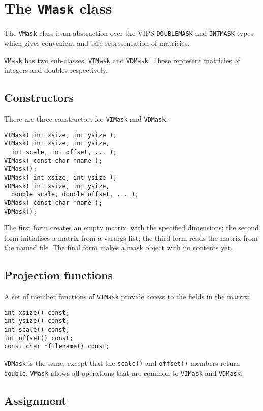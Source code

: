 \section{The \texttt{VMask} class}

The \verb+VMask+ class is an abstraction over the VIPS \verb+DOUBLEMASK+ and
\verb+INTMASK+ types which gives convenient and safe representation of
matricies.

\verb+VMask+ has two sub-classes, \verb+VIMask+ and \verb+VDMask+. These
represent matricies of integers and doubles respectively.

\subsection{Constructors}

There are three constructors for \verb+VIMask+ and \verb+VDMask+:

\begin{verbatim}
VIMask( int xsize, int ysize );
VIMask( int xsize, int ysize, 
  int scale, int offset, ... );
VIMask( const char *name );
VIMask();
VDMask( int xsize, int ysize );
VDMask( int xsize, int ysize, 
  double scale, double offset, ... );
VDMask( const char *name );
VDMask();
\end{verbatim}

The first form creates an empty matrix, with the specified dimensions;
the second form initialises a matrix from a varargs list; the third form
reads the matrix from the named file. The final form makes a mask object
with no contents yet.

\subsection{Projection functions}

A set of member functions of \verb+VIMask+ provide access to the fields in
the matrix:

\begin{verbatim}
int xsize() const;
int ysize() const;
int scale() const;
int offset() const;
const char *filename() const;
\end{verbatim}

\verb+VDMask+ is the same, except that the \verb+scale()+ and \verb+offset()+
members return \verb+double+. \verb+VMask+ allows all operations that are
common to \verb+VIMask+ and \verb+VDMask+.

\subsection{Assignment}

